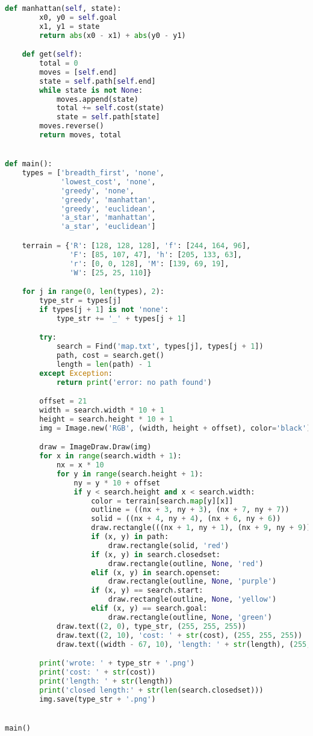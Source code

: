 \documentclass[11pt,letterpaper]{article}
\begin{document}
\begin{lstlisting}[language=Python]
    def manhattan(self, state):
        x0, y0 = self.goal
        x1, y1 = state
        return abs(x0 - x1) + abs(y0 - y1)

    def get(self):
        total = 0
        moves = [self.end]
        state = self.path[self.end]
        while state is not None:
            moves.append(state)
            total += self.cost(state)
            state = self.path[state]
        moves.reverse()
        return moves, total


def main():
    types = ['breadth_first', 'none',
             'lowest_cost', 'none',
             'greedy', 'none',
             'greedy', 'manhattan',
             'greedy', 'euclidean',
             'a_star', 'manhattan',
             'a_star', 'euclidean']

    terrain = {'R': [128, 128, 128], 'f': [244, 164, 96],
               'F': [85, 107, 47], 'h': [205, 133, 63],
               'r': [0, 0, 128], 'M': [139, 69, 19],
               'W': [25, 25, 110]}

    for j in range(0, len(types), 2):
        type_str = types[j]
        if types[j + 1] is not 'none':
            type_str += '_' + types[j + 1]

        try:
            search = Find('map.txt', types[j], types[j + 1])
            path, cost = search.get()
            length = len(path) - 1
        except Exception:
            return print('error: no path found')

        offset = 21
        width = search.width * 10 + 1
        height = search.height * 10 + 1
        img = Image.new('RGB', (width, height + offset), color='black')

        draw = ImageDraw.Draw(img)
        for x in range(search.width + 1):
            nx = x * 10
            for y in range(search.height + 1):
                ny = y * 10 + offset
                if y < search.height and x < search.width:
                    color = terrain[search.map[y][x]]
                    outline = ((nx + 3, ny + 3), (nx + 7, ny + 7))
                    solid = ((nx + 4, ny + 4), (nx + 6, ny + 6))
                    draw.rectangle(((nx + 1, ny + 1), (nx + 9, ny + 9)), tuple(color))
                    if (x, y) in path:
                        draw.rectangle(solid, 'red')
                    if (x, y) in search.closedset:
                        draw.rectangle(outline, None, 'red')
                    elif (x, y) in search.openset:
                        draw.rectangle(outline, None, 'purple')
                    if (x, y) == search.start:
                        draw.rectangle(outline, None, 'yellow')
                    elif (x, y) == search.goal:
                        draw.rectangle(outline, None, 'green')
            draw.text((2, 0), type_str, (255, 255, 255))
            draw.text((2, 10), 'cost: ' + str(cost), (255, 255, 255))
            draw.text((width - 67, 10), 'length: ' + str(length), (255, 255, 255))

        print('wrote: ' + type_str + '.png')
        print('cost: ' + str(cost))
        print('length: ' + str(length))
        print('closed length:' + str(len(search.closedset)))
        img.save(type_str + '.png')


main()
\end{lstlisting}
\end{document}
